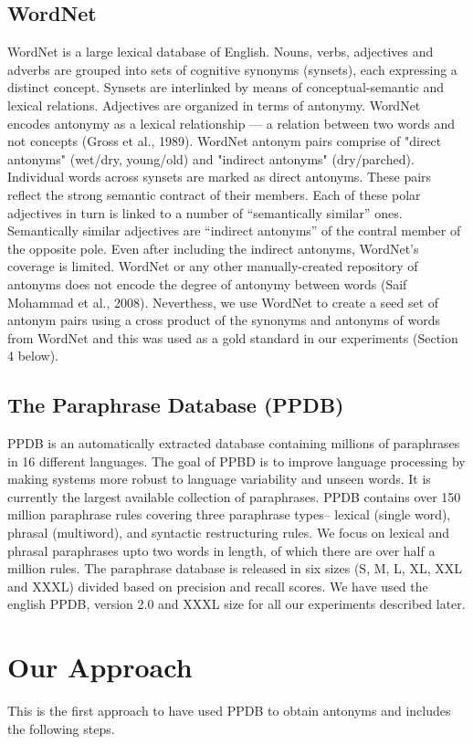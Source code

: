 \documentclass[11pt]{article}
\begin{document}
\subsection{WordNet}
WordNet is a large lexical database of English. Nouns, verbs, adjectives and adverbs are grouped into sets of cognitive synonyms (synsets), each expressing a distinct concept. Synsets are interlinked by means of conceptual-semantic and lexical relations. Adjectives are organized in terms of antonymy. WordNet encodes antonymy as a lexical relationship — a relation between two words and not concepts (Gross et al., 1989). WordNet antonym pairs comprise of "direct antonyms" (wet/dry, young/old) and "indirect antonyms" (dry/parched). Individual words across synsets are marked as direct antonyms. These pairs reflect the strong semantic contract of their members. Each of these polar adjectives in turn is linked to a number of “semantically similar” ones. Semantically similar adjectives are “indirect antonyms” of the contral member of the opposite pole. Even after including the indirect antonyms, WordNet’s coverage is limited. WordNet or any other manually-created repository of antonyms does not encode the degree of antonymy between words (Saif Mohammad et al., 2008). Neverthess, we use WordNet to create a seed set of antonym pairs using a cross product of the synonyms and antonyms of words from WordNet and this was used as a gold standard in our experiments (Section 4 below).

\subsection{The Paraphrase Database (PPDB)}
PPDB is an automatically extracted database containing millions of paraphrases in 16 different languages. The goal of PPBD is to improve language processing by making systems more robust to language variability and unseen words. It is currently the largest available collection of paraphrases. PPDB contains over 150 million paraphrase rules covering three paraphrase types– lexical (single word), phrasal (multiword), and syntactic restructuring rules. We focus on lexical and phrasal paraphrases upto two words in length, of which there are over half a million rules. The paraphrase database is released in six sizes (S, M, L, XL, XXL and XXXL) divided based on precision and recall scores. We have used the english PPDB, version 2.0 and XXXL size for all our experiments described later.

\section{Our Approach}
This is the first approach to have used PPDB to obtain antonyms and includes the following steps.
\end{document}
